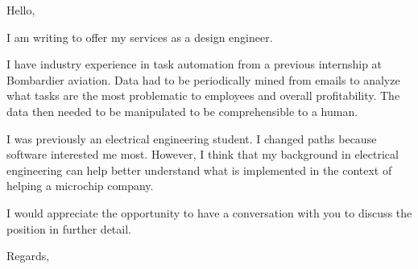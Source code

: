 \documentclass[12pt]{letter}
\begin{document}
\pagestyle{headings}

\begin{letter}{}
\address{Montréal, Canada}

\opening{Hello,}


I am writing to offer my services as a design engineer.

I have industry experience in task automation from a previous internship at Bombardier aviation. Data had to be periodically mined from emails to analyze what tasks are the most problematic to employees and overall profitability. The data then needed to be manipulated to be comprehensible to a human.

I was previously an electrical engineering student. I changed paths because software interested me most. However, I think that my background in electrical engineering can help better understand what is implemented in the context of helping a microchip company.

I would appreciate the opportunity to have a conversation with you to discuss the position in further detail.
\signature{Maxime}

\closing{Regards,}


\end{letter}
\end{document}
